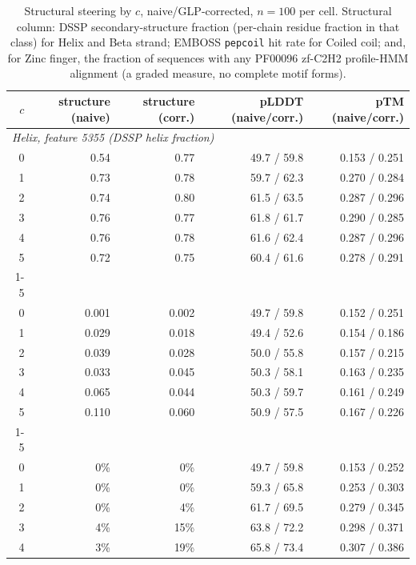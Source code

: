 \documentclass{article}
\begin{document}
\begin{table}[h]
\centering
\caption{Structural steering by $c$, naive/GLP-corrected, $n{=}100$ per cell.
Structural column: DSSP secondary-structure fraction (per-chain residue fraction in that class)
for Helix and Beta strand; EMBOSS \texttt{pepcoil} hit rate for Coiled coil; and, for Zinc
finger, the fraction of sequences with any PF00096 zf-C2H2 profile-HMM alignment (a graded
measure, no complete motif forms).}
\label{tab:steer-sae-clamp}
\begin{tabular}{rrrrr}
\toprule
$c$ & structure (naive) & structure (corr.) & pLDDT (naive/corr.) & pTM (naive/corr.) \\
\midrule
\multicolumn{5}{l}{\textit{Helix, feature 5355 (DSSP helix fraction)}} \\
0 & 0.54 & 0.77 & 49.7 / 59.8 & 0.153 / 0.251 \\
1 & 0.73 & 0.78 & 59.7 / 62.3 & 0.270 / 0.284 \\
2 & 0.74 & 0.80 & 61.5 / 63.5 & 0.287 / 0.296 \\
3 & 0.76 & 0.77 & 61.8 / 61.7 & 0.290 / 0.285 \\
4 & 0.76 & 0.78 & 61.6 / 62.4 & 0.287 / 0.296 \\
5 & 0.72 & 0.75 & 60.4 / 61.6 & 0.278 / 0.291 \\
\cmidrule(lr){1-5}
\multicolumn{5}{l}{\textit{Beta strand, feature 2868 (DSSP strand fraction)}} \\
0 & 0.001 & 0.002 & 49.7 / 59.8 & 0.152 / 0.251 \\
1 & 0.029 & 0.018 & 49.4 / 52.6 & 0.154 / 0.186 \\
2 & 0.039 & 0.028 & 50.0 / 55.8 & 0.157 / 0.215 \\
3 & 0.033 & 0.045 & 50.3 / 58.1 & 0.163 / 0.235 \\
4 & 0.065 & 0.044 & 50.3 / 59.7 & 0.161 / 0.249 \\
5 & 0.110 & 0.060 & 50.9 / 57.5 & 0.167 / 0.226 \\
\cmidrule(lr){1-5}
\multicolumn{5}{l}{\textit{Coiled coil, feature 813 (\texttt{pepcoil} hit rate)}} \\
0 & 0\% & 0\% & 49.7 / 59.8 & 0.153 / 0.252 \\
1 & 0\% & 0\% & 59.3 / 65.8 & 0.253 / 0.303 \\
2 & 0\% & 4\% & 61.7 / 69.5 & 0.279 / 0.345 \\
3 & 4\% & 15\% & 63.8 / 72.2 & 0.298 / 0.371 \\
4 & 3\% & 19\% & 65.8 / 73.4 & 0.307 / 0.386 \\

\end{tabular}
\end{table}
\end{document}
